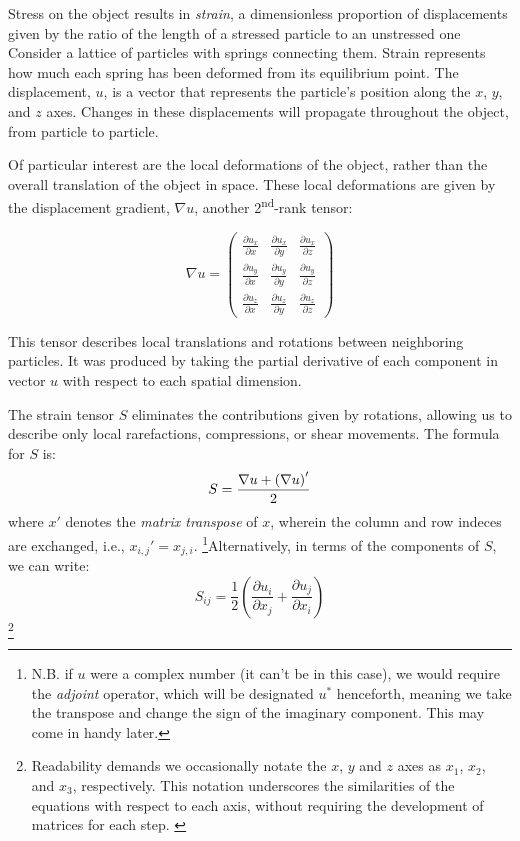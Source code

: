 \documentclass[a4paper,10pt]{report}
\numberwithin{equation}{section}
\begin{document}
Stress on the object results in \emph{strain}, a dimensionless proportion of
displacements given by the ratio of the length of a stressed particle to an unstressed one Consider a lattice of particles with springs connecting them. Strain represents how much each spring has been deformed from its equilibrium point.
The displacement, $u$, is a vector that represents the particle's position along
the $x$, $y$, and $z$ axes. Changes in these displacements will propagate throughout the object, from particle to particle. \cite{Ballantine1997, Kino1987}

Of particular interest are the local deformations of the object, rather than the overall translation of the object in space. These local deformations are given by the displacement gradient, $\nabla u$, another 2\textsuperscript{nd}-rank tensor\cite[p.~12]{Ballantine1997}:
\begin{singlespace}
\begin{equation*}\label{dispgrad}
\nabla u = \begin{pmatrix}
         \frac{\partial u_x}{\partial x} & \frac{\partial u_x}{\partial y} &
\frac{\partial u_x}{\partial z} \\[0.5em]
         \frac{\partial u_y}{\partial x} & \frac{\partial u_y}{\partial y} &
\frac{\partial u_y}{\partial z} \\[0.5em]
         \frac{\partial u_z}{\partial x} & \frac{\partial u_z}{\partial y} &
\frac{\partial u_z}{\partial z}
        \end{pmatrix}
\end{equation*}
\end{singlespace}
This tensor describes local translations and rotations between neighboring
particles. It was produced by taking the partial derivative of each component in vector $u$ with respect to each spatial dimension.

The strain tensor $S$ eliminates the contributions given by rotations, allowing us to describe only local rarefactions, compressions, or shear movements. The formula for $S$ is:
\begin{equation*}
S = \frac{\nabla u + \left(\nabla u \right)'}{2} \notag \\
\end{equation*}
where $x'$ denotes the \emph{matrix transpose} of $x$, wherein the column and row indeces are exchanged, i.e., $x_{i,j}' = x_{j,i}$. \footnote{N.B. if $u$ were a complex number (it can't be in this case), we would require the \emph{adjoint} operator, which will be designated $u^{*}$ henceforth, meaning we take the transpose and change the sign of the imaginary component. This may come in handy later. }Alternatively, in terms of the components of $S$, we can write\cite[p.~13]{Ballantine1997}:
\begin{equation}\label{strain}
S_{ij} = \frac{1}{2}\left(\frac{\partial u_i}{\partial x_j} + \frac{\partial
u_j}{\partial x_i}\right)
\end{equation}
\footnote{Readability demands we occasionally notate the $x$, $y$ and $z$ axes as $x_1$,
$x_2$, and $x_3$, respectively. This notation
underscores the similarities of the equations with respect to each axis, without
requiring the development of matrices for each step. \cite[p.~16]{Ballantine1997} \cite[p.~542]{Kino1987}}
\end{document}
